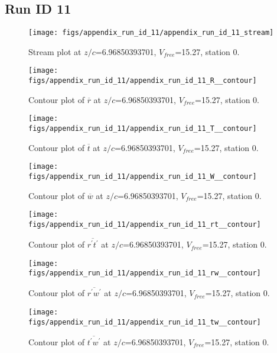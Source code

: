 \subsection{Run ID 11}
\begin{figure}[H]
\centering
\texttt{[image: figs/appendix\_run\_id\_11/appendix\_run\_id\_11\_stream]}
\caption{Stream plot at $z/c$=6.96850393701, $V_{free}$=15.27, station 0.}
\label{fig:appendix_run_id_11_stream}
\end{figure}


\begin{figure}[H]
\centering
\texttt{[image: figs/appendix\_run\_id\_11/appendix\_run\_id\_11\_R\_\_contour]}
\caption{Contour plot of $\overline{r}$ at $z/c$=6.96850393701, $V_{free}$=15.27, station 0.}
\label{fig:appendix_run_id_11_R__contour}
\end{figure}


\begin{figure}[H]
\centering
\texttt{[image: figs/appendix\_run\_id\_11/appendix\_run\_id\_11\_T\_\_contour]}
\caption{Contour plot of $\overline{t}$ at $z/c$=6.96850393701, $V_{free}$=15.27, station 0.}
\label{fig:appendix_run_id_11_T__contour}
\end{figure}


\begin{figure}[H]
\centering
\texttt{[image: figs/appendix\_run\_id\_11/appendix\_run\_id\_11\_W\_\_contour]}
\caption{Contour plot of $\overline{w}$ at $z/c$=6.96850393701, $V_{free}$=15.27, station 0.}
\label{fig:appendix_run_id_11_W__contour}
\end{figure}


\begin{figure}[H]
\centering
\texttt{[image: figs/appendix\_run\_id\_11/appendix\_run\_id\_11\_rt\_\_contour]}
\caption{Contour plot of $\overline{r^\prime t^\prime}$ at $z/c$=6.96850393701, $V_{free}$=15.27, station 0.}
\label{fig:appendix_run_id_11_rt__contour}
\end{figure}


\begin{figure}[H]
\centering
\texttt{[image: figs/appendix\_run\_id\_11/appendix\_run\_id\_11\_rw\_\_contour]}
\caption{Contour plot of $\overline{r^\prime w^\prime}$ at $z/c$=6.96850393701, $V_{free}$=15.27, station 0.}
\label{fig:appendix_run_id_11_rw__contour}
\end{figure}


\begin{figure}[H]
\centering
\texttt{[image: figs/appendix\_run\_id\_11/appendix\_run\_id\_11\_tw\_\_contour]}
\caption{Contour plot of $\overline{t^\prime w^\prime}$ at $z/c$=6.96850393701, $V_{free}$=15.27, station 0.}
\label{fig:appendix_run_id_11_tw__contour}
\end{figure}



